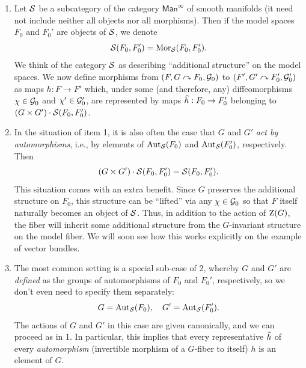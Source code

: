 \begin{enumerate}
    \item Let $\mathcal{S}$ be a subcategory of the category $\mathsf{Man}^\infty$ of smooth manifolds (it need not include neither all objects nor all morphisms). Then if the model spaces $F_0$ and $F_0'$ are objects of $\mathcal{S}$, we denote
    \[\mathcal{S}(F_0,F_0')=\operatorname{Mor}_{\mathcal{S}}(F_0,F_0').\]
    We think of the category $\mathcal{S}$ as describing ``additional structure'' on the model spaces. We now define morphisms from $(F,G\curvearrowright F_0,\mathcal{G}_0)$ to $(F',G'\curvearrowright F_0',\mathcal{G}_0')$ as maps $h:F\to F'$ which, under some (and therefore, any) diffeomorphisms $\chi\in\mathcal{G}_0$ and $\chi'\in\mathcal{G}_0'$, are represented by maps $\wh{h}:F_0\to F_0'$ belonging to $(G\times G')\cdot \mathcal{S}(F_0,F_0')$.
    
    \item In the situation of item 1, it is also often the case that $G$ and $G'$ \emph{act by automorphisms}, i.e., by elements of $\operatorname{Aut}_{\mathcal{S}}(F_0)$ and $\operatorname{Aut}_{\mathcal{S}}(F_0')$, respectively. Then 
    \[(G\times G')\cdot \mathcal{S}(F_0,F_0')=\mathcal{S}(F_0,F_0').\]
    This situation comes with an extra benefit. Since $G$ preserves the additional structure on $F_0$, this structure can be ``lifted'' via any $\chi\in \mathcal{G}_0$ so that $F$ itself naturally becomes an object of $\mathcal{S}$. Thus, in addition to the action of $\mathrm{Z}(G)$, the fiber will inherit some additional structure from the $G$-invariant structure on the model fiber. We will soon see how this works explicitly on the example of vector bundles.
    \item The most common setting is a special sub-case of 2, whereby $G$ and $G'$ are \emph{defined} as the groups of automorphisms of $F_0$ and $F_0'$, respectively, so we don't even need to specify them separately:
    \[G=\operatorname{Aut}_{\mathcal{S}}(F_0),\quad G'=\operatorname{Aut}_{\mathcal{S}}(F_0').\]
    The actions of $G$ and $G'$ in this case are given canonically, and we can proceed as in 1. In particular, this implies that every representative $\wh{h}$ of every \emph{automorphism} (invertible morphism of a $G$-fiber to itself) $h$ is an element of $G$.
\end{enumerate}

